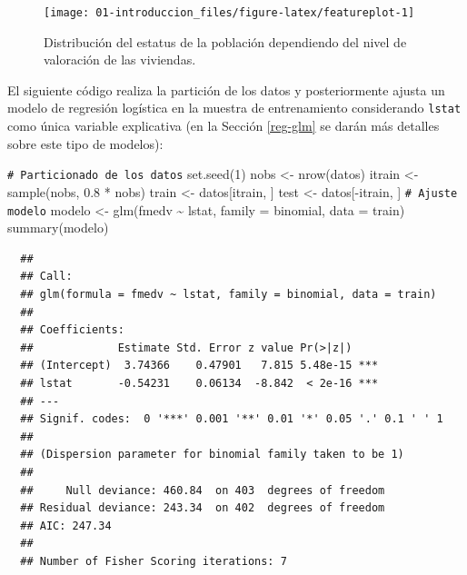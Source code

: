 \documentclass[
]{book}
\newenvironment{Shaded}{\begin{snugshade}}{\end{snugshade}}
\newcommand{\AttributeTok}[1]{\textcolor[rgb]{0.77,0.63,0.00}{#1}}
\newcommand{\CommentTok}[1]{\textcolor[rgb]{0.56,0.35,0.01}{\textit{#1}}}
\newcommand{\DecValTok}[1]{\textcolor[rgb]{0.00,0.00,0.81}{#1}}
\newcommand{\FloatTok}[1]{\textcolor[rgb]{0.00,0.00,0.81}{#1}}
\newcommand{\FunctionTok}[1]{\textcolor[rgb]{0.00,0.00,0.00}{#1}}
\newcommand{\NormalTok}[1]{#1}
\newcommand{\OtherTok}[1]{\textcolor[rgb]{0.56,0.35,0.01}{#1}}
\newcommand{\SpecialCharTok}[1]{\textcolor[rgb]{0.00,0.00,0.00}{#1}}
\theoremstyle{break}
\theoremstyle{nonumberplain}
\renewcommand{\CommentTok}[1]{\textcolor[rgb]{0.41,0.41,0.41}{\texttt{#1}}}
\begin{document}
\begin{figure}[!htb]

{\centering \texttt{[image: 01-introduccion\_files/figure-latex/featureplot-1]} 

}

\caption{Distribución del estatus de la población dependiendo del nivel de valoración de las viviendas.}\label{fig:featureplot}
\end{figure}

El siguiente código realiza la partición de los datos y posteriormente ajusta un modelo de regresión logística en la muestra de entrenamiento considerando \texttt{lstat} como única variable explicativa (en la Sección \ref{reg-glm} se darán más detalles sobre este tipo de modelos):

\begin{Shaded}
\begin{Highlighting}[]
\CommentTok{\# Particionado de los datos}
\FunctionTok{set.seed}\NormalTok{(}\DecValTok{1}\NormalTok{)}
\NormalTok{nobs }\OtherTok{\textless{}{-}} \FunctionTok{nrow}\NormalTok{(datos)}
\NormalTok{itrain }\OtherTok{\textless{}{-}} \FunctionTok{sample}\NormalTok{(nobs, }\FloatTok{0.8} \SpecialCharTok{*}\NormalTok{ nobs)}
\NormalTok{train }\OtherTok{\textless{}{-}}\NormalTok{ datos[itrain, ]}
\NormalTok{test }\OtherTok{\textless{}{-}}\NormalTok{ datos[}\SpecialCharTok{{-}}\NormalTok{itrain, ]}
\CommentTok{\# Ajuste modelo}
\NormalTok{modelo }\OtherTok{\textless{}{-}} \FunctionTok{glm}\NormalTok{(fmedv }\SpecialCharTok{\textasciitilde{}}\NormalTok{ lstat, }\AttributeTok{family =}\NormalTok{ binomial, }\AttributeTok{data =}\NormalTok{ train)}
\FunctionTok{summary}\NormalTok{(modelo)}
\end{Highlighting}
\end{Shaded}

\begin{verbatim}
  ## 
  ## Call:
  ## glm(formula = fmedv ~ lstat, family = binomial, data = train)
  ## 
  ## Coefficients:
  ##             Estimate Std. Error z value Pr(>|z|)    
  ## (Intercept)  3.74366    0.47901   7.815 5.48e-15 ***
  ## lstat       -0.54231    0.06134  -8.842  < 2e-16 ***
  ## ---
  ## Signif. codes:  0 '***' 0.001 '**' 0.01 '*' 0.05 '.' 0.1 ' ' 1
  ## 
  ## (Dispersion parameter for binomial family taken to be 1)
  ## 
  ##     Null deviance: 460.84  on 403  degrees of freedom
  ## Residual deviance: 243.34  on 402  degrees of freedom
  ## AIC: 247.34
  ## 
  ## Number of Fisher Scoring iterations: 7
\end{verbatim}
\end{document}
